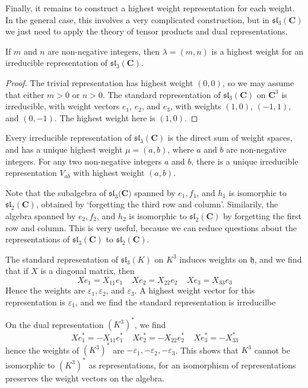 Finally, it remains to construct a highest weight representation for each weight. In the general case, this involves a very complicated construction, but in $\mathfrak{sl}_3(\mathbf{C})$ we just need to apply the theory of tensor products and dual representations.

\begin{theorem}
    If $m$ and $n$ are non-negative integers, then $\lambda = (m,n)$ is a highest weight for an irreducible representation of $\mathfrak{sl}_3(\mathbf{C})$.
\end{theorem}
\begin{proof}
    

    The trivial representation has highest weight $(0,0)$, so we may assume that either $m > 0$ or $n > 0$. The standard representation of $\mathfrak{sl}_3(\mathbf{C})$ on $\mathbf{C}^3$ is irreducible, with weight vectors $e_1$, $e_2$, and $e_3$, with weights $(1,0)$, $(-1,1)$, and $(0,-1)$. The highest weight here is $(1,0)$.
\end{proof}

\begin{theorem}
    Every irreducible representation of $\mathfrak{sl}_3(\mathbf{C})$ is the direct sum of weight spaces, and has a unique highest weight $\mu = (a,b)$, where $a$ and $b$ are non-negative integers. For any two non-negative integers $a$ and $b$, there is a unique irreducible representation $V_{ab}$ with highest weight $(a,b)$.
\end{theorem}

Note that the subalgebra of $\mathfrak{sl}_3(\mathbf{C)}$ spanned by $e_1, f_1$, and $h_1$ is isomorphic to $\mathfrak{sl}_2(\mathbf{C})$, obtained by `forgetting the third row and column'. Similarily, the algebra spanned by $e_2, f_2$, and $h_2$ is isomorphic to $\mathfrak{sl}_2(\mathbf{C})$ by forgetting the first row and column. This is very useful, because we can reduce questions about the representations of $\mathfrak{sl}_3(\mathbf{C})$ to $\mathfrak{sl}_2(\mathbf{C})$.

\begin{example}
    The standard representation of $\mathfrak{sl}_3(K)$ on $K^3$ induces weights on $\mathfrak{h}$, and we find that if $X$ is a diagonal matrix, then
    \[ Xe_1 = X_{11} e_1\ \ \ \ \ Xe_2 = X_{22} e_2\ \ \ \ \ Xe_3 = X_{33} e_3 \]
    Hence the weights are $\varepsilon_1, \varepsilon_2$, and $\varepsilon_3$. A highest weight vector for this representation is $\varepsilon_1$, and we find the standard representation is irreducilbe 

    On the dual representation $(K^3)^*$, we find
    \[ Xe_1^* = - X_{11}e_1^*\ \ \ \ \ Xe_2^* = -X_{22} e_2^*\ \ \ \ \ Xe_3^* = -X_{33}^* \]
    hence the weights of $(K^3)^*$ are $-\varepsilon_1, -\varepsilon_2, -\varepsilon_3$. This shows that $K^3$ cannot be isomorphic to $(K^3)^*$ as representations, for an isomorphism of representations preserves the weight vectors on the algebra.
\end{example}

